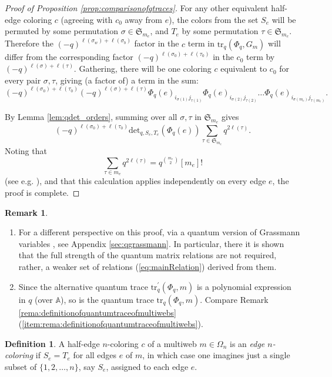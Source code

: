 \documentclass[12pt, reqno]{amsart}
\theoremstyle{definition}
\newtheorem{defi}[theo]{Definition}
\newtheorem{rema}[theo]{Remark}
\renewcommand{\det}{\mathrm{det}}%
\newcommand{\trqc}{\mathrm{tr}_q}%
\begin{document}
\begin{proof}[Proof of Proposition \ref{prop:comparisonofqtraces}]
For any other equivalent half-edge coloring $c$ (agreeing with $c_0$ away from $e$),  the colors from the set $S_e$ will be permuted by some permutation $\sigma\in\mathfrak{S}_{m_e}$, and $T_e$ by some permutation $\tau \in \mathfrak{S}_{m_e}$.   Therefore the $(-q)^{\ell(\sigma_w) + \ell(\sigma_b)}$ factor in the $c$ term in $\trqc(\Phi_q,G_m)$  will differ from the corresponding factor $(-q)^{\ell(\sigma_0)+\ell(\tau_0)}$ in the $c_0$ term by $(-q)^{\ell(\sigma) + \ell(\tau)}$.  Gathering, there will be one coloring $c$ equivalent to $c_0$ for every pair $\sigma,\tau$, giving (a factor of) a term in the sum:
$$ 
(-q)^{\ell(\sigma_0)+\ell(\tau_0)} (-q)^{\ell(\sigma)+\ell(\tau)} \Phi_q(e)_{i_{\sigma(1)}j_{\tau(1)}}\Phi_q(e)_{i_{\sigma(2)}j_{\tau(2)}} \dots \Phi_q(e)_{i_{\sigma(m_e)}j_{\tau(m_e)}}. 
$$

By Lemma \ref{lem:qdet_orders}, summing over all $\sigma,\tau$ in $\mathfrak{S}_{m_e}$ gives  
$$
(-q)^{\ell(\sigma_0)+\ell(\tau_0)}  \det_{q,S_e,T_e}(\Phi_q(e)) \sum_{\tau\in\mathfrak{S}_{m_e}} q^{2\ell(\tau)}.
$$  
Noting that 
$$
\sum_{\tau\in m_e} q^{2\ell(\tau)} = q^{\binom{m_e}{2}}[m_e]!
$$ 
(see e.g. \cite{sikora1}), and that this calculation applies independently on every edge $e$, the proof is complete.	
\end{proof} 

\begin{rema}\label{rema:qtraceispolyexpressioninqconnection}
\begin{enumerate}
\item
For a different perspective on this proof, via a quantum version of Grassmann variables \cite{bigYellowCFT1997}, see Appendix \ref{sec:qgrassmann}.  In particular, there it is shown that the full strength of the quantum matrix relations are not required, rather, a weaker set of relations (\ref{eq:mainRelation}) derived from them.
\item\label{item:qtraceispolyexpressioninqconnection}
Since the alternative quantum trace $\trqc^\prime(\Phi_q,m)$ is a polynomial expression in $q$ (over $\mathbb{A}$), so is the quantum trace $\trqc(\Phi_q,m)$.  Compare Remark \ref{rema:definitionofquantumtraceofmultiwebs} (\ref{item:rema:definitionofquantumtraceofmultiwebs}).  
\end{enumerate}
\end{rema}

\begin{defi}\label{defi:edge-coloring}
A half-edge $n$-coloring $c$ of a multiweb $m\in\Omega_n$ is an \emph{edge $n$-coloring} if $S_e=T_e$ for all edges $e$ of $m$, in which case one imagines just a single subset of $\{1,2,\dots,n\}$, say $S_e$, assigned to each edge $e$.
\end{defi}
\end{document}
